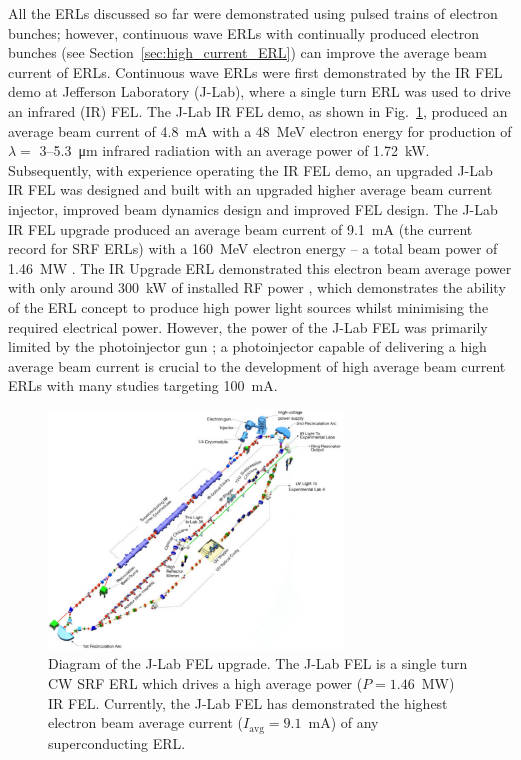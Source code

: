 \documentclass[../main.tex]{subfiles}
\begin{document}
All the ERLs discussed so far were demonstrated using pulsed trains of electron bunches; however, continuous wave ERLs with continually produced electron bunches (see Section~\ref{sec:high_current_ERL}) can improve the average beam current of ERLs. Continuous wave ERLs were first demonstrated \cite{neil2000sustained} by the IR FEL demo \cite{benson1999first,neil2000sustained} at Jefferson Laboratory (J-Lab), where a single turn ERL was used to drive an infrared (IR) FEL. The J-Lab IR FEL demo, as shown in Fig.~\ref{fig:J_Lab_FEL_diagram}, produced an average beam current of 4.8~\si{\milli\ampere} with a 48~\si{\mega\electronvolt} electron energy for production of $\lambda =$ 3--5.3~\si{\micro\meter} infrared radiation with an average power of 1.72~\si{\kilo\watt}. Subsequently, with experience operating the IR FEL demo, an upgraded J-Lab IR FEL was designed \cite{benson2002have} and built \cite{behre2004first} with an upgraded higher average beam current injector, improved beam dynamics design and improved FEL design. The J-Lab IR FEL upgrade produced an average beam current of 9.1~\si{\milli\ampere} (the current record for SRF ERLs) with a 160~\si{\mega\electronvolt} electron energy -- a total beam power of 1.46~\si{\mega\watt} \cite{neil2006jlab}. The IR Upgrade ERL demonstrated this electron beam average power with only around 300~\si{\kilo\watt} of installed RF power \cite{adolphsen2022european}, which demonstrates the ability of the ERL concept to produce high power light sources whilst minimising the required electrical power. However, the power of the J-Lab FEL was primarily limited by the photoinjector gun \cite{hannon2008high}; a photoinjector capable of delivering a high average beam current is crucial to the development of high average beam current ERLs with many studies \cite{hannon2008high,dunham2013record,neumann2013towards} targeting 100~\si{\milli\ampere}.   
\begin{figure}[!h]
\centering
\includegraphics[width=0.7\textwidth]{Figures/Introduction/JLab_FEL.pdf}
\caption{Diagram of the J-Lab FEL upgrade. The J-Lab FEL is a single turn CW SRF ERL which drives a high average power ($P = 1.46$~\si{\mega\watt}) IR FEL. Currently, the J-Lab FEL has demonstrated the highest electron beam average current ($I_{\mathrm{avg}} = 9.1$~\si{\milli\ampere}) of any superconducting ERL.}
\label{fig:J_Lab_FEL_diagram}
\end{figure}
\end{document}
